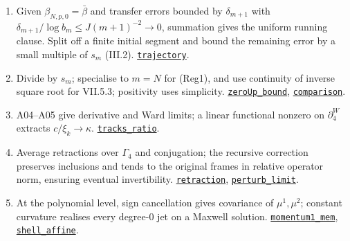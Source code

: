 \documentclass[
  letterpaper,
  11pt]{article}
\providecommand{\tightlist}{%
  \setlength{\itemsep}{0pt}\setlength{\parskip}{0pt}}
\begin{document}
\begin{enumerate}
\def\labelenumi{\arabic{enumi}.}
\tightlist
\item
  Given \(\beta_{N,p,0}=\bar\beta\) and transfer errors bounded by
  \(\delta_{m+1}\) with \(\delta_{m+1}/\log b_m\le J(m+1)^{-2}\to0\),
  summation gives the uniform running clause. Split off a finite initial
  segment and bound the remaining error by a small multiple of \(s_m\)
  (III.2).
  \href{https://github.com/yang-mills-group/OpenAI-YM-20261028/blob/3456e5e75cf8d4cd558955a5c7638fba2d68f464/YM/Shoot/Race.lean\#L23-L53}{\texttt{trajectory}}.
\item
  Divide by \(s_m\); specialise to \(m=N\) for (Reg1), and use
  continuity of inverse square root for VII.5.3; positivity uses
  simplicity.
  \href{https://github.com/yang-mills-group/OpenAI-YM-20261028/blob/3456e5e75cf8d4cd558955a5c7638fba2d68f464/YM/Pert/Asymptotics/RawAxis.lean\#L15-L30}{\texttt{zeroUp\_bound}},
  \href{https://github.com/yang-mills-group/OpenAI-YM-20261028/blob/3456e5e75cf8d4cd558955a5c7638fba2d68f464/YM/Pert/Asymptotics/RawAxis.lean\#L36-L48}{\texttt{comparison}}.
\item
  A04--A05 give derivative and Ward limits; a linear functional nonzero
  on \(\partial^W_4\) extracts \(c/\xi_k\to\kappa\).
  \href{https://github.com/yang-mills-group/OpenAI-YM-20261028/blob/3456e5e75cf8d4cd558955a5c7638fba2d68f464/YM/Extra/WEAK_SCALING_ACTLAW/Orientation.lean\#L43-L54}{\texttt{tracks\_ratio}}.
\item
  Average retractions over \(\Gamma_4\) and conjugation; the recursive
  correction preserves inclusions and tends to the original frames in
  relative operator norm, ensuring eventual invertibility.
  \href{https://github.com/yang-mills-group/OpenAI-YM-20261028/blob/3456e5e75cf8d4cd558955a5c7638fba2d68f464/YM/Extra/WEAK_SCALING_ACTLAW/Adjust.lean\#L35-L55}{\texttt{retraction}},
  \href{https://github.com/yang-mills-group/OpenAI-YM-20261028/blob/3456e5e75cf8d4cd558955a5c7638fba2d68f464/YM/Extra/WEAK_SCALING_ACTLAW/Adjust.lean\#L113-L129}{\texttt{perturb\_limit}}.
\item
  At the polynomial level, sign cancellation gives covariance of
  \(\mu^1,\mu^2\); constant curvature realises every degree-0 jet on a
  Maxwell solution.
  \href{https://github.com/yang-mills-group/OpenAI-YM-20261028/blob/3456e5e75cf8d4cd558955a5c7638fba2d68f464/YM/TraceExtension/Foundation/Caps.lean\#L28-L34}{\texttt{momentum1\_mem}},
  \href{https://github.com/yang-mills-group/OpenAI-YM-20261028/blob/3456e5e75cf8d4cd558955a5c7638fba2d68f464/YM/TraceExtension/Foundation/Caps.lean\#L43-L50}{\texttt{shell\_affine}}.
\end{enumerate}
\end{document}
